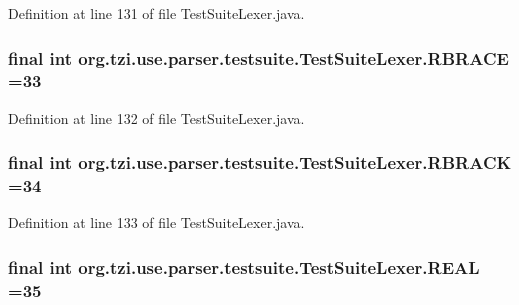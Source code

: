 Definition at line 131 of file Test\-Suite\-Lexer.\-java.

\hypertarget{classorg_1_1tzi_1_1use_1_1parser_1_1testsuite_1_1_test_suite_lexer_a6e1ebc54007324cc283ea45261b3a000}{
\subsubsection[{R\-B\-R\-A\-C\-E}]{\setlength{\rightskip}{0pt plus 5cm}final int org.\-tzi.\-use.\-parser.\-testsuite.\-Test\-Suite\-Lexer.\-R\-B\-R\-A\-C\-E =33\hspace{0.3cm}{\ttfamily [static]}}}\label{classorg_1_1tzi_1_1use_1_1parser_1_1testsuite_1_1_test_suite_lexer_a6e1ebc54007324cc283ea45261b3a000}


Definition at line 132 of file Test\-Suite\-Lexer.\-java.

\hypertarget{classorg_1_1tzi_1_1use_1_1parser_1_1testsuite_1_1_test_suite_lexer_abde9a7792bf74d86557a8bd290ea825b}{
\subsubsection[{R\-B\-R\-A\-C\-K}]{\setlength{\rightskip}{0pt plus 5cm}final int org.\-tzi.\-use.\-parser.\-testsuite.\-Test\-Suite\-Lexer.\-R\-B\-R\-A\-C\-K =34\hspace{0.3cm}{\ttfamily [static]}}}\label{classorg_1_1tzi_1_1use_1_1parser_1_1testsuite_1_1_test_suite_lexer_abde9a7792bf74d86557a8bd290ea825b}


Definition at line 133 of file Test\-Suite\-Lexer.\-java.

\hypertarget{classorg_1_1tzi_1_1use_1_1parser_1_1testsuite_1_1_test_suite_lexer_a8996a2dad1da68a1f71da7406dc92e67}{
\subsubsection[{R\-E\-A\-L}]{\setlength{\rightskip}{0pt plus 5cm}final int org.\-tzi.\-use.\-parser.\-testsuite.\-Test\-Suite\-Lexer.\-R\-E\-A\-L =35\hspace{0.3cm}{\ttfamily [static]}}}\label{classorg_1_1tzi_1_1use_1_1parser_1_1testsuite_1_1_test_suite_lexer_a8996a2dad1da68a1f71da7406dc92e67}


